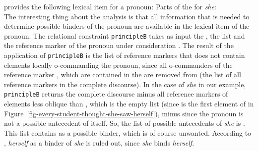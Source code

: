 \documentclass[output=paper,biblatex,babelshorthands,newtxmath,draftmode,colorlinks,citecolor=brown]{langscibook}
\begin{document}
\citet[]{Branco2002a} provides the following lexical item for a pronoun:
\eas
Parts of the \synsemv for \emph{she}:\\
\zs
The interesting thing about the analysis is that all information that is needed to determine
possible binders of the pronoun are available in the lexical item of the pronoun. The relational
constraint \texttt{principleB} takes as input the \listal {}, the \listu list  and the reference marker
of the pronoun under consideration . The result of the application of \texttt{principleB} is the list
of reference markers that does not contain elements locally o-commanding the pronoun, since all
o-commanders of the reference marker , which are contained in the \lista are removed from \listu (the
list of all reference markers in the complete discourse). In the case of \emph{she} in our example,
\texttt{principleB} returns the complete discourse  minus all reference markers of elements less oblique than , which is the empty
list (since  is the first element of  in
Figure~\ref{fig-every-student-thought-she-saw-herself}), minus  since the pronoun is not a
possible antecedent of itself. So, the list of possible antecedents of \emph{she} is . This list contains  as a possible binder, which
is of course unwanted. According to \citet[]{Branco2002a}, \emph{herself} as a binder of
\emph{she} is ruled out, since \emph{she} binds \emph{herself}.
\end{document}
